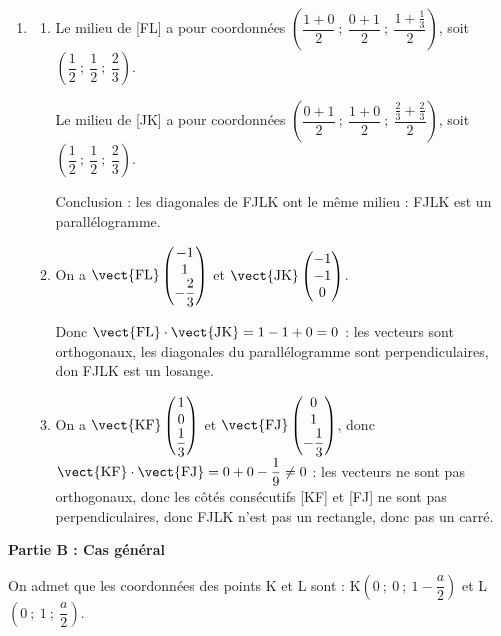 \begin{enumerate}
\begin{enumerate}
L$\left(0~;~1~;~ \frac{1}{3}\right)$.
	\end{enumerate}
\item
	\begin{enumerate}
		\item 
Le milieu de [FL] a pour coordonnées $\left(\dfrac{1 + 0}{2}~;~\dfrac{0 + 1}{2}~;~\dfrac{1 + \frac{1}{3}}{2} \right)$, soit $\left(\dfrac{1}{2}~;~\dfrac{1}{2}~;~\dfrac{2}{3} \right)$.

Le milieu de [JK] a pour coordonnées $\left(\dfrac{0 + 1}{2}~;~\dfrac{1 + 0}{2}~;~\dfrac{\frac{2}{3} + \frac{2}{3}}{2} \right)$, soit $\left(\dfrac{1}{2}~;~\dfrac{1}{2}~;~\dfrac{2}{3} \right)$.

Conclusion : les diagonales de FJLK ont le même milieu : FJLK est un parallélogramme.
		\item 
		On a $\vect{\text{FL}}\begin{pmatrix}-1\\1\\- \dfrac{2}{3}\end{pmatrix}$ et  $\vect{\text{JK}}\begin{pmatrix}-1\\-1\\ 0\end{pmatrix}$.
	
	Donc $\vect{\text{FL}} \cdot \vect{\text{JK}} = 1 - 1 + 0 = 0$ : les vecteurs sont orthogonaux, les diagonales du parallélogramme sont perpendiculaires, don FJLK est un losange.
		\item 
		On a $\vect{\text{KF}}\begin{pmatrix}1\\0\\\dfrac{1}{3}\end{pmatrix}$ et $\vect{\text{FJ}}\begin{pmatrix}0\\1\\-\dfrac{1}{3}\end{pmatrix}$, donc $\vect{\text{KF}} \cdot \vect{\text{FJ}} = 0 + 0 - \dfrac{1}{9} \ne 0$ : les vecteurs ne sont pas orthogonaux, donc les côtés consécutifs [KF] et [FJ] ne sont pas perpendiculaires, donc FJLK n'est pas un rectangle, donc pas un carré.
	\end{enumerate}
\end{enumerate}

\bigskip

\textbf{Partie B : Cas général}

\medskip

On admet que les coordonnées des points K et L sont : K$\left(0~;~0~;~1- \dfrac{a}{2}\right)$ et L$\left(0~;~1~;~\dfrac{a}{2}\right)$.

